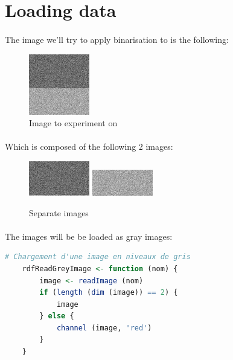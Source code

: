 \section{Loading data}
\paragraph{}
The image we'll try to apply binarisation to is the following:

\begin{figure}[h]
    \centering
    \includegraphics{2classes_100_100_8bits_2016.png}
    \caption{Image to experiment on}
    \label{merged-image}
\end{figure}

\paragraph{}
Which is composed of the following 2 images:

\begin{figure}[h]
    \centering
    \includegraphics{2classes_100_100_8bits_omega1_2016.png}
    \includegraphics{2classes_100_100_8bits_omega2_2016.png}
    \caption{Separate images}
    \label{separate-images}
\end{figure}

\paragraph{}
The images will be be loaded as gray images:

\begin{lstlisting}[language=R, caption=Loading data]
    # Chargement d'une image en niveaux de gris
    rdfReadGreyImage <- function (nom) {
        image <- readImage (nom)
        if (length (dim (image)) == 2) {
            image
        } else {
            channel (image, 'red')
        }
    }   
\end{lstlisting}


